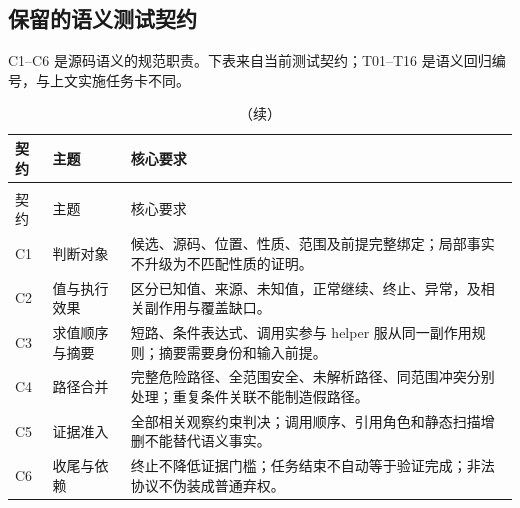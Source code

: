 \subsection{保留的语义测试契约}
C1--C6 是源码语义的规范职责。下表来自当前测试契约；T01--T16 是语义回归编号，与上文实施任务卡不同。
\begin{longtable}{L{13mm}L{35mm}L{101mm}}
\caption{语义契约及其执行要求。}\\
\toprule 契约 & 主题 & 核心要求\\\midrule\endfirsthead
\caption[]{（续）}\\
\toprule 契约 & 主题 & 核心要求\\\midrule\endhead
C1 & 判断对象 & 候选、源码、位置、性质、范围及前提完整绑定；局部事实不升级为不匹配性质的证明。\\
C2 & 值与执行效果 & 区分已知值、来源、未知值，正常继续、终止、异常，及相关副作用与覆盖缺口。\\
C3 & 求值顺序与摘要 & 短路、条件表达式、调用实参与 helper 服从同一副作用规则；摘要需要身份和输入前提。\\
C4 & 路径合并 & 完整危险路径、全范围安全、未解析路径、同范围冲突分别处理；重复条件关联不能制造假路径。\\
C5 & 证据准入 & 全部相关观察约束判决；调用顺序、引用角色和静态扫描增删不能替代语义事实。\\
C6 & 收尾与依赖 & 终止不降低证据门槛；任务结束不自动等于验证完成；非法协议不伪装成普通弃权。\\
\bottomrule
\end{longtable}
